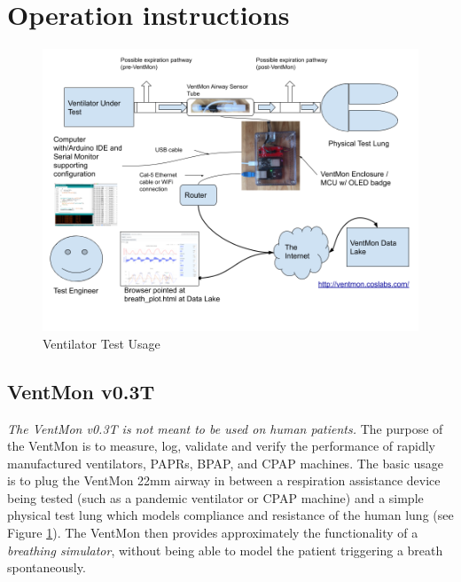 \documentclass[11pt, letterpaper]{article}
\begin{document}

\section{Operation instructions}

\begin{figure}[H]
\centering
\includegraphics[width=\textwidth]{VentMonOverallArchitecture.png}
\caption{Ventilator Test Usage}
\label{fig:vtestusage}
\end{figure}


\subsection{VentMon v0.3T}

{\em The VentMon v0.3T is not meant to be used on human patients. }
The purpose of the VentMon is to measure, log, validate and verify the performance of rapidly manufactured ventilators, PAPRs, BPAP, and CPAP machines. The basic usage is to plug the VentMon 22mm airway in between a respiration assistance device being tested (such as a pandemic ventilator or CPAP machine) and a simple physical test lung which models compliance and resistance of the human lung (see Figure \ref{fig:vtestusage}). The VentMon then provides approximately the functionality of a {\em breathing simulator}, without being able to model the patient triggering a breath spontaneously.
\end{document}
